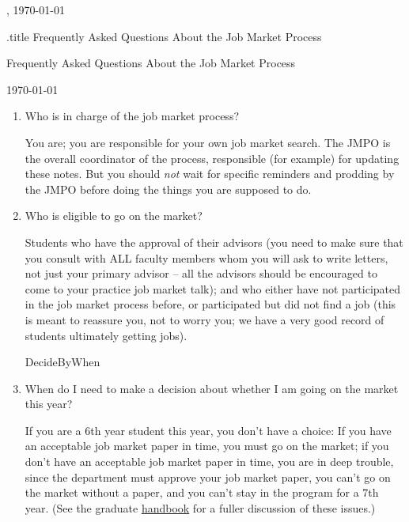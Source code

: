 \documentclass{econtex}
\providecommand\phantomsection{}
\begin{document}
\hfill{\tiny \jobname, \today} \vspace{.1in}

\begin{verbatimwrite}{\jobname.title}
Frequently Asked Questions About the Job Market Process
\end{verbatimwrite}

\centerline{\Large Frequently Asked Questions About the Job Market Process}\medskip\medskip

\centerline{\today}\medskip\medskip

\ifdvi\large\fi

\begin{enumerate}

\item Who is in charge of the job market process?
  
  You are; you are responsible for your own job market search.  The
  JMPO is the overall coordinator of the process, responsible (for
  example) for updating these notes.  But you should {\it not} wait
  for specific reminders and prodding by the JMPO before doing the
  things you are supposed to do.

\item Who is eligible to go on the market?
  
  Students who have the approval of their advisors (you need to make
  sure that you consult with ALL faculty members whom you will ask to
  write letters, not just your primary advisor -- all the advisors
  should be encouraged to come to your practice job market talk); and
  who either have not participated in the job market process before,
  or participated but did not find a job (this is meant to reassure
  you, not to worry you; we have a very good record of students
  ultimately getting jobs).

  \ifdvi\phantomsection\hypertarget{DecideByWhen}{DecideByWhen}\fi
  
\item When do I need to make a decision about whether I am going on
the market this year?

If you are a 6th year student this year, you don't have a choice: If
you have an acceptable job market paper in time, you must go on the
market; if you don't have an acceptable job market paper in time, you
are in deep trouble, since the department must approve your job market
paper, you can't go on the market without a paper, and you can't stay
in the program for a 7th year.  (See the graduate \href{http://www.econ2.jhu.edu/pdf/Econ\_Grad\_Handbook.pdf}{handbook} for a fuller discussion of these issues.) 


\end{enumerate}
\end{document}
